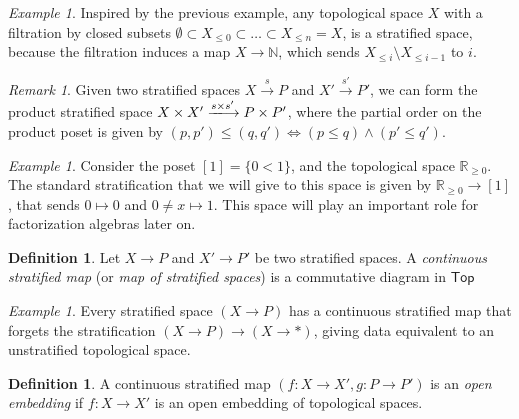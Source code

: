 \documentclass[12pt,a4paper]{article}
\newcounter{counter} \numberwithin{counter}{section}
\theoremstyle{definition}
\newtheorem{definition}[counter]{Definition}
\theoremstyle{plain}
\theoremstyle{remark}
\newtheorem{example}[counter]{Example}
\newtheorem{remark}[counter]{Remark}
\newcommand{\hoint}{\mathbb{R}_{\geq 0}}
\begin{document}
\begin{example}
    Inspired by the previous example, any topological space $X$ with a filtration by closed subsets $\emptyset \subset X_{\leq 0} \subset \dots \subset X_{\leq n} = X$, is a stratified space, because the filtration induces a map $X \rightarrow \mathbb{N}$, which sends $X_{\leq i} \setminus X_{\leq i-1}$ to $i$.
\end{example}

\begin{remark}
    Given two stratified spaces $X \xrightarrow{s} P$ and $X' \xrightarrow{s'} P'$, we can form the product stratified space $X \times X' \xlongrightarrow{s \times s'} P \times P'$, where the partial order on the product poset is given by $(p,p') \leq (q, q') \iff (p \leq q) \land (p' \leq q')$.
\end{remark}

\begin{example}
    Consider the poset $[1] = \{0 < 1\}$, and the topological space $\hoint$. The standard stratification that we will give to this space is given by $\hoint \rightarrow [1]$, that sends $0 \mapsto 0$ and $0 \neq x \mapsto 1$. This space will play an important role for factorization algebras later on.
\end{example}

\begin{definition}
    Let $X \rightarrow P$ and $X' \rightarrow P'$ be two stratified spaces. A \emph{continuous stratified map} (or \emph{map of stratified spaces}) is a commutative diagram in $\mathsf{Top}$
    \begin{center}
    \end{center}
\end{definition}

\begin{example}\label{ex:forget_strat}
    Every stratified space $(X \rightarrow P)$ has a continuous stratified map that forgets the stratification $(X \rightarrow P) \rightarrow (X \rightarrow *)$, giving data equivalent to an unstratified topological space. 
\end{example}

\begin{definition}
    A continuous stratified map $(f: X \rightarrow X', g: P \rightarrow P')$ is an \emph{open embedding} if $f: X \rightarrow X'$ is an open embedding of topological spaces.
\end{definition}
\end{document}
